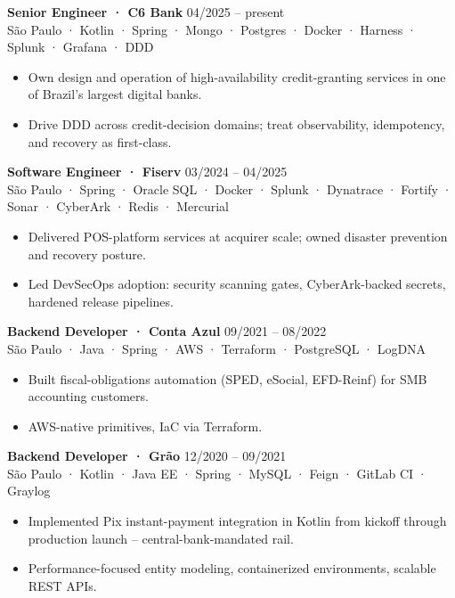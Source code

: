 \documentclass[11pt,a4paper]{article}
\begin{document}
\noindent\textbf{Senior Engineer · C6 Bank} \hfill 04/2025 -- present\\
{\small\color{muted}São Paulo · Kotlin · Spring · Mongo · Postgres · Docker · Harness · Splunk · Grafana · DDD}
\begin{itemize}
\item Own design and operation of high-availability credit-granting services in one of Brazil's largest digital banks.
\item Drive DDD across credit-decision domains; treat observability, idempotency, and recovery as first-class.
\end{itemize}

\noindent\textbf{Software Engineer · Fiserv} \hfill 03/2024 -- 04/2025\\
{\small\color{muted}São Paulo · Spring · Oracle SQL · Docker · Splunk · Dynatrace · Fortify · Sonar · CyberArk · Redis · Mercurial}
\begin{itemize}
\item Delivered POS-platform services at acquirer scale; owned disaster prevention and recovery posture.
\item Led DevSecOps adoption: security scanning gates, CyberArk-backed secrets, hardened release pipelines.
\end{itemize}

\noindent\textbf{Backend Developer · Conta Azul} \hfill 09/2021 -- 08/2022\\
{\small\color{muted}São Paulo · Java · Spring · AWS · Terraform · PostgreSQL · LogDNA}
\begin{itemize}
\item Built fiscal-obligations automation (SPED, eSocial, EFD-Reinf) for SMB accounting customers.
\item AWS-native primitives, IaC via Terraform.
\end{itemize}

\noindent\textbf{Backend Developer · Grão} \hfill 12/2020 -- 09/2021\\
{\small\color{muted}São Paulo · Kotlin · Java EE · Spring · MySQL · Feign · GitLab CI · Graylog}
\begin{itemize}
\item Implemented Pix instant-payment integration in Kotlin from kickoff through production launch -- central-bank-mandated rail.
\item Performance-focused entity modeling, containerized environments, scalable REST APIs.
\end{itemize}
\end{document}
